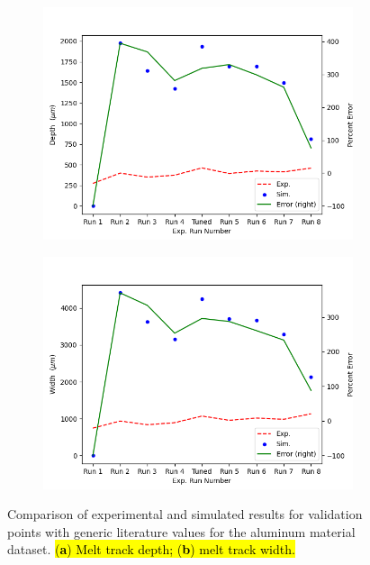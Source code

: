 \documentclass[metals,article,accept,pdftex,moreauthors]{Definitions/mdpi}
\begin{document}
\vspace{-12pt}
\begin{figure}[H]
\begin{subfigure}[c]{0.45\textwidth}
\includegraphics[width=\textwidth]{melt_track_val_baseline_depth}
\caption{\centering}
\label{fig:melt_track_val_baseline_depth}
\end{subfigure}
\begin{subfigure}[c]{0.45\textwidth}\centering
\includegraphics[width=\textwidth]{melt_track_val_baseline_width}
\caption{\centering}
\label{fig:melt_track_val_baseline_width}
\end{subfigure}
\caption{Comparison of experimental and simulated results for validation points with 
generic literature values for the aluminum material dataset. \hl{(\textbf{a}) Melt track 
depth; (\textbf{b}) melt track width.}}
\label{fig:melt_track_val_baseline}
\end{figure}
\end{document}
